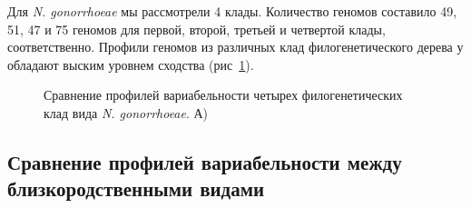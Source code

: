 Для \textit{N. gonorrhoeae} мы рассмотрели 4 клады. Количество геномов составило 49, 51, 47 и 75 геномов для первой, второй, третьей и четвертой клады, соответственно. Профили геномов из различных клад филогенетического дерева у обладают выским уровнем сходства (рис~\ref{img:ghono_complex}).

\begin{figure}[!ht] 
  \center
  \caption{Сравнение профилей вариабельности четырех филогенетических клад вида \textit{N. gonorrhoeae}. А) }
  \label{img:ghono_complex} 
\end{figure}

\subsection{Сравнение профилей вариабельности между близкородственными видами}

